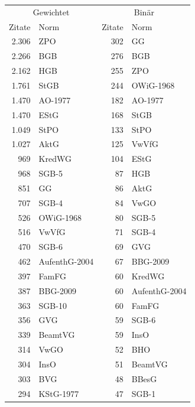 \begin{tabular}{rl|rl}
\multicolumn{2}{c}{Gewichtet} & \multicolumn{2}{|c}{Binär} \\
Zitate & Norm & Zitate & Norm \\
\midrule
2.306 & ZPO & 302 & GG \\
2.266 & BGB & 276 & BGB \\
2.162 & HGB & 255 & ZPO \\
1.761 & StGB & 244 & OWiG-1968 \\
1.470 & AO-1977 & 182 & AO-1977 \\
1.470 & EStG & 168 & StGB \\
1.049 & StPO & 133 & StPO \\
1.027 & AktG & 125 & VwVfG \\
969 & KredWG & 104 & EStG \\
968 & SGB-5 & 87 & HGB \\
851 & GG & 86 & AktG \\
707 & SGB-4 & 84 & VwGO \\
526 & OWiG-1968 & 80 & SGB-5 \\
516 & VwVfG & 71 & SGB-4 \\
470 & SGB-6 & 69 & GVG \\
462 & AufenthG-2004 & 67 & BBG-2009 \\
397 & FamFG & 60 & KredWG \\
387 & BBG-2009 & 60 & AufenthG-2004 \\
363 & SGB-10 & 60 & FamFG \\
356 & GVG & 59 & SGB-6 \\
339 & BeamtVG & 59 & InsO \\
314 & VwGO & 52 & BHO \\
304 & InsO & 51 & BeamtVG \\
303 & BVG & 48 & BBesG \\
294 & KStG-1977 & 47 & SGB-1 \\
\end{tabular}
